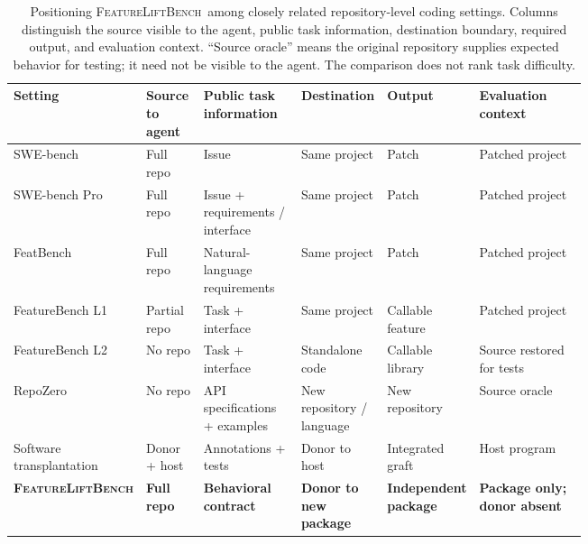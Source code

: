 \documentclass[acmsmall,screen,review,anonymous]{acmart}
\newcommand{\flb}{\textsc{FeatureLiftBench}\xspace}
\begin{document}
\begin{table}[tb]
  \caption{Positioning \flb\ among closely related repository-level coding
  settings. Columns distinguish the source visible to the agent, public task
  information, destination boundary, required output, and evaluation context.
  ``Source oracle'' means the original repository supplies expected behavior
  for testing; it need not be visible to the agent. The comparison does not
  rank task difficulty.}
  \label{tab:setting-comparison}
  \centering
  \footnotesize
  \setlength{\tabcolsep}{1.5pt}
  \renewcommand{\arraystretch}{1.15}
  \begin{tabularx}{\linewidth}{
      @{}
      >{\raggedright\arraybackslash}p{0.19\linewidth}
      >{\raggedright\arraybackslash}p{0.10\linewidth}
      >{\raggedright\arraybackslash}p{0.17\linewidth}
      >{\raggedright\arraybackslash}p{0.15\linewidth}
      >{\raggedright\arraybackslash}p{0.13\linewidth}
      >{\raggedright\arraybackslash}X
      @{}
    }
    \toprule
    Setting & Source to agent & Public task information & Destination & Output & Evaluation context \\
    \midrule

    SWE-bench
      & Full repo & Issue & Same project & Patch & Patched project \\

    SWE-bench Pro
      & Full repo & Issue + requirements / interface & Same project & Patch & Patched project \\

    FeatBench
      & Full repo & Natural-language requirements & Same project & Patch & Patched project \\

    FeatureBench L1
      & Partial repo & Task + interface & Same project & Callable feature & Patched project \\

    FeatureBench L2
      & No repo & Task + interface & Standalone code & Callable library & Source restored for tests \\

    RepoZero
      & No repo & API specifications + examples & New repository / language & New repository & Source oracle \\

    Software transplantation
      & Donor + host & Annotations + tests & Donor to host & Integrated graft & Host program \\

    \midrule
    \textbf{\flb}
      & \textbf{Full repo}
      & \textbf{Behavioral contract}
      & \textbf{Donor to new package}
      & \textbf{Independent package}
      & \textbf{Package only; donor absent} \\

    \bottomrule
  \end{tabularx}
\end{table}
\end{document}
